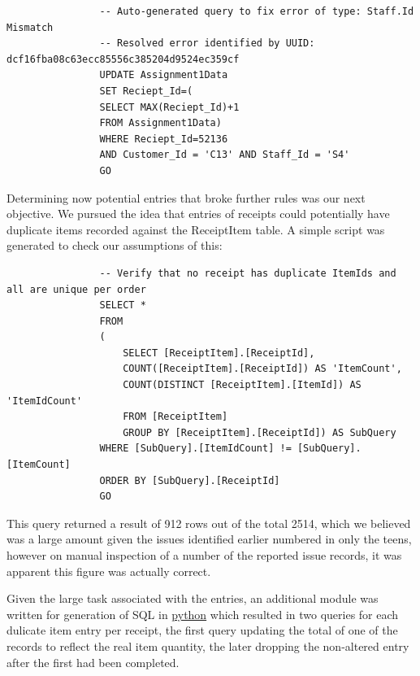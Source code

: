 \documentclass{article}
\begin{document}
            \begin{lstlisting}
                -- Auto-generated query to fix error of type: Staff.Id Mismatch
                -- Resolved error identified by UUID: dcf16fba08c63ecc85556c385204d9524ec359cf
                UPDATE Assignment1Data 
                SET Reciept_Id=(
                SELECT MAX(Reciept_Id)+1 
                FROM Assignment1Data)
                WHERE Reciept_Id=52136
                AND Customer_Id = 'C13' AND Staff_Id = 'S4'
                GO
            \end{lstlisting}

            Determining now potential entries that broke further rules was our next objective.
            We pursued the idea that entries of receipts could potentially have duplicate items
            recorded against the ReceiptItem table. A simple script was generated to check our 
            assumptions of this:

            \begin{lstlisting}
                -- Verify that no receipt has duplicate ItemIds and all are unique per order
                SELECT *
                FROM
                (
                    SELECT [ReceiptItem].[ReceiptId], 
                    COUNT([ReceiptItem].[ReceiptId]) AS 'ItemCount',
                    COUNT(DISTINCT [ReceiptItem].[ItemId]) AS 'ItemIdCount'
                    FROM [ReceiptItem]
                    GROUP BY [ReceiptItem].[ReceiptId]) AS SubQuery 
                WHERE [SubQuery].[ItemIdCount] != [SubQuery].[ItemCount]
                ORDER BY [SubQuery].[ReceiptId]
                GO
            \end{lstlisting}

            This query returned a result of 912 rows out of the total 2514, which we believed 
            was a large amount given the issues identified earlier numbered in only the teens, 
            however on manual inspection of a number of the reported issue records, it was 
            apparent this figure was actually correct. 
            \par
            Given the large task associated with the entries, an additional module was
            written for generation of SQL in \hyperref[sec:Python]{\color{blue}python} which resulted in two queries for each
            dulicate item entry per receipt, the first query updating the total of one of the 
            records to reflect the real item quantity, the later dropping the non-altered 
            entry after the first had been completed.
\end{document}
